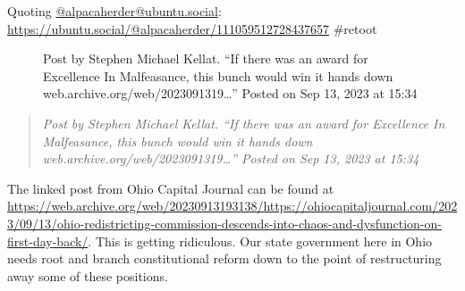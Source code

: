 Quoting
\href{https://ubuntu.social/@alpacaherder}{@alpacaherder@ubuntu.social}:
\url{https://ubuntu.social/@alpacaherder/111059512728437657} \#retoot

\begin{figure}
\centering
{}
\caption{Post by Stephen Michael Kellat. ``If there was an award for
Excellence In Malfeasance, this bunch would win it hands down
web.archive.org/web/2023091319\ldots{}'' Posted on Sep 13, 2023 at
15:34}
\end{figure}

\begin{quote}
\emph{Post by Stephen Michael Kellat. ``If there was an award for
Excellence In Malfeasance, this bunch would win it hands down
web.archive.org/web/2023091319\ldots{}'' Posted on Sep 13, 2023 at
15:34}
\end{quote}

The linked post from Ohio Capital Journal can be found at
\url{https://web.archive.org/web/20230913193138/https://ohiocapitaljournal.com/2023/09/13/ohio-redistricting-commission-descends-into-chaos-and-dysfunction-on-first-day-back/}.
This is getting ridiculous. Our state government here in Ohio needs root
and branch constitutional reform down to the point of restructuring away
some of these positions.
